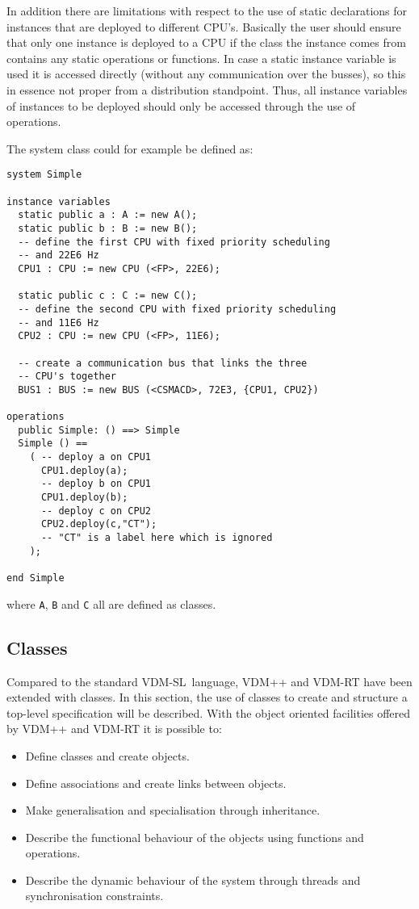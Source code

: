 \documentclass{overturerepchap}
\begin{document}
{\begin{description}
In addition there are limitations with respect to the use of static
declarations for instances that are deployed to different
CPU's. Basically the user should ensure that only one instance is
deployed to a CPU if the class the instance comes from contains any
static operations or functions. In case a static instance variable is
used it is accessed directly (without any communication over the
busses), so this in essence not proper from a distribution
standpoint. Thus, all instance variables of instances to be deployed
should only be accessed through the use of operations.

\item[Example:] The system class could for example be defined as:
\begin{lstlisting}
system Simple

instance variables
  static public a : A := new A();
  static public b : B := new B();
  -- define the first CPU with fixed priority scheduling
  -- and 22E6 Hz
  CPU1 : CPU := new CPU (<FP>, 22E6);

  static public c : C := new C();
  -- define the second CPU with fixed priority scheduling
  -- and 11E6 Hz
  CPU2 : CPU := new CPU (<FP>, 11E6);

  -- create a communication bus that links the three
  -- CPU's together
  BUS1 : BUS := new BUS (<CSMACD>, 72E3, {CPU1, CPU2})

operations
  public Simple: () ==> Simple
  Simple () ==
    ( -- deploy a on CPU1
      CPU1.deploy(a);
      -- deploy b on CPU1
      CPU1.deploy(b);
      -- deploy c on CPU2
      CPU2.deploy(c,"CT");
      -- "CT" is a label here which is ignored
    );

end Simple
\end{lstlisting}
\noindent where \texttt{A}, \texttt{B} and \texttt{C} all are defined
as classes.
\end{description}

\subsection{Classes}
\label{sec:classdep}

Compared to the standard VDM-SL\ language, VDM++ and VDM-RT have been
extended with classes. In this section, the use of classes to create
and structure a top-level specification will be described. With the
object oriented facilities offered by VDM++ and VDM-RT it is possible to:

\begin{itemize}
\item Define classes and create objects.
\item Define associations and create links between objects.
\item Make generalisation and specialisation through inheritance.
\item Describe the functional behaviour of the objects using functions
  and operations.
\item Describe the dynamic behaviour of the system through threads and
  synchronisation constraints.
\end{itemize}

}
\end{document}
